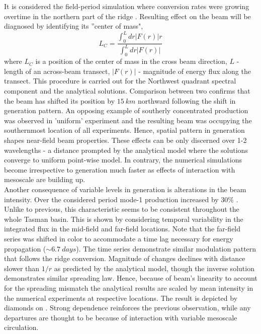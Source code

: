 \documentclass[12pt]{article}
\begin{document}
It is considered the field-period simulation where conversion rates were growing overtime in the 
northern part of the ridge . Resulting effect on the beam will 
be diagnosed by identifying its ''center of mass",
\begin{equation}
L_{C} = \frac{\int_0^{L} dr |F(r)|r}{\int_0^{L} dr |F(r)|}
\end{equation}
where $L_{C}$ is a position of the center of mass in the cross beam direction, $L$ - length 
of an across-beam transect, $|F(r)|$ - magnitude of energy flux along the transect. This procedure 
is carried out for the Northwest quadrant spectral component and the analytical solutions. 
Comparison between two confirms that the beam has shifted its position by $15~km$ northward 
 following the shift in generation pattern. An opposing example of 
southerly concentrated production was observed  in 'uniform' experiment and 
the resulting beam was occupying the southernmost location of all experiments. Hence, spatial 
pattern in generation shapes near-field beam properties. These effects can be only discerned over 
1-2 wavelengths - a distance prompted by the analytical model where the solutions converge to 
uniform point-wise model. In contrary, the numerical simulations become irrespective to generation 
much faster as effects of interaction with mesoscale are building up.\\
Another consequence of variable levels in generation is alterations in the beam intensity. Over the 
considered period mode-1 production increased by $30\%$ . Unlike to 
previous, this characteristic seems to be consistent throughout the whole Tasman basin. This is 
shown by considering temporal variability in the integrated flux in the mid-field and far-field 
locations. Note that the far-field series was shifted in color to accommodate a time lag necessary 
for energy propagation ($\sim 6.7~days$). The time series demonstrate similar modulation 
pattern that follows the ridge conversion. Magnitude of changes declines with distance slower 
than $1/r$ as predicted by the analytical model, though the inverse solution 
 demonstrates similar spreading law. Hence, because of beam's linearity 
to account for the spreading mismatch the analytical results are scaled by mean intensity in the 
numerical experiments at respective locations. The result is depicted by diamonds on 
. Strong dependence reinforces the previous observation, while any 
departures are thought to be because of interaction with variable mesoscale circulation.
\end{document}
